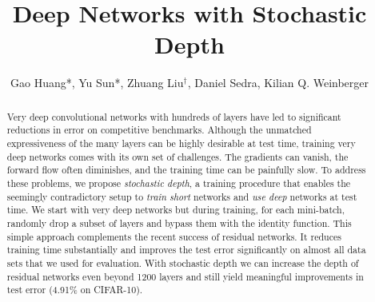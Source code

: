 \documentclass[runningheads]{llncs}
\begin{document}
\pagestyle{headings}

\mainmatter

\def\ECCV16SubNumber{1641}  

\newcommand{\name}{stochastic depth}



\title{Deep Networks with Stochastic Depth}





\author{{Gao Huang*, Yu Sun*, Zhuang Liu$^\dagger$, Daniel Sedra, Kilian Q. Weinberger}}


\maketitle



\begin{abstract}

Very deep convolutional networks with hundreds of layers have led to significant reductions in error on competitive benchmarks. Although the unmatched expressiveness of the many layers can be highly desirable at test time, training very deep networks comes with its own set of challenges. The gradients can vanish, the forward flow often diminishes, and the training time can be painfully slow. To address these problems, we propose \emph{\name{}}, a training procedure that enables the seemingly contradictory setup to \emph{train short} networks and \emph{use deep} networks at test time. We start with very deep networks but during training, for each mini-batch, randomly drop a subset of layers and bypass them with the identity function. This simple approach complements the recent success of residual networks. It reduces training time substantially and improves the test error significantly on almost all data sets that we used for evaluation. With \name{} we can increase the depth of residual networks even beyond 1200 layers and still yield meaningful improvements in test error (4.91\% on CIFAR-10). 


\end{abstract}
\end{document}
